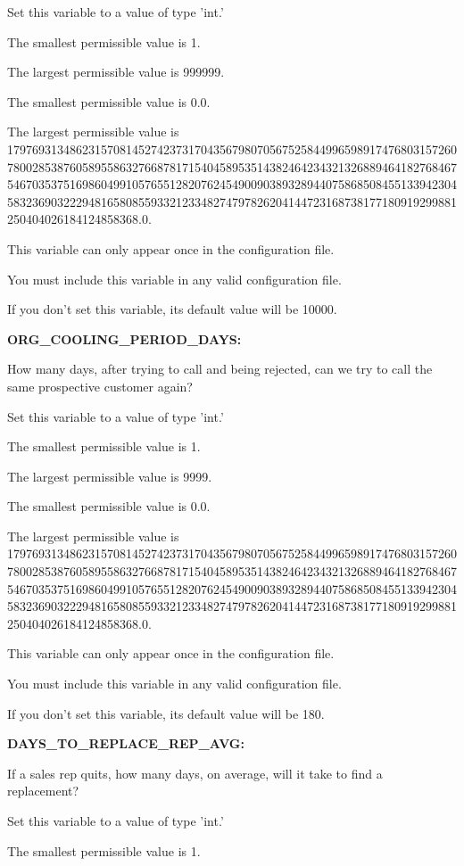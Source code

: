 Set this variable to a value of type 'int.'

The smallest permissible value is 1.

The largest permissible value is 999999.

The smallest permissible value is 0.0.

The largest permissible value is 179769313486231570814527423731704356798070567525844996598917476803157260780028538760589558632766878171540458953514382464234321326889464182768467546703537516986049910576551282076245490090389328944075868508455133942304583236903222948165808559332123348274797826204144723168738177180919299881250404026184124858368.0.

This variable can only appear once in the configuration file.

You must include  this variable in any valid configuration file.

If you don't set this variable, its default value will be 10000.


\textbf{ORG\_COOLING\_PERIOD\_DAYS:}


How many days, after trying to call and being rejected, can we try to call the same prospective customer again?

Set this variable to a value of type 'int.'

The smallest permissible value is 1.

The largest permissible value is 9999.

The smallest permissible value is 0.0.

The largest permissible value is 179769313486231570814527423731704356798070567525844996598917476803157260780028538760589558632766878171540458953514382464234321326889464182768467546703537516986049910576551282076245490090389328944075868508455133942304583236903222948165808559332123348274797826204144723168738177180919299881250404026184124858368.0.

This variable can only appear once in the configuration file.

You must include  this variable in any valid configuration file.

If you don't set this variable, its default value will be 180.


\textbf{DAYS\_TO\_REPLACE\_REP\_AVG:}


If a sales rep quits, how many days, on average, will it take to find a replacement?

Set this variable to a value of type 'int.'

The smallest permissible value is 1.

